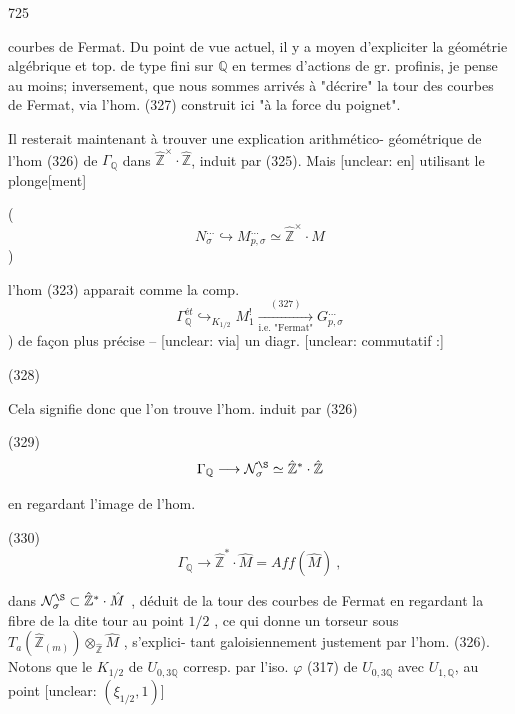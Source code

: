725

courbes de Fermat. Du point de vue actuel,
il y a moyen d'expliciter la géométrie
algébrique et top. de type fini sur $\mathbb{Q}$ en
termes d'actions de gr. profinis,
je pense au moins; inversement, que
nous sommes arrivés à "décrire" la
tour des courbes de Fermat, via
l'hom. (327) construit ici "à la
force du poignet".

Il resterait maintenant à
trouver une explication arithmético-
géométrique de l'hom (326) de
$\Gamma_{\mathbb{Q}}$ dans $\hat{\mathbb{Z}}^\times \cdot \hat{\mathbb{Z}}$, induit par (325).
Mais [unclear: en] utilisant le plonge[ment]

( $$ N_\sigma^{\dots} \hookrightarrow M_{p,\sigma}^{\dots} \simeq \hat{\mathbb{Z}}^\times \cdot M $$ )

l'hom (323) apparait comme la comp.
$$ \Gamma_{\mathbb{Q}}^{ét} \hookrightarrow_{K_{1/2}} M_{1}^{!} \xrightarrow[\text{i.e. "Fermat"}]{(327)} G_{p,\sigma}^{\dots} $$ )
de façon plus précise -- [unclear: via] un diagr.
[unclear: commutatif :]

\newpage


(328)

Cela signifie donc que l'on trouve
l'hom. induit par (326)

(329) $$\Gamma_{\mathbb{Q}} \longrightarrow \mathcal{N}_\sigma^\S \simeq \hat{\mathbb{Z}}^* \cdot \hat{\mathbb{Z}}$$

en regardant l'image de l'hom.

(330) $$\Gamma_{\mathbb{Q}} \longrightarrow \hat{\mathbb{Z}}^* \cdot \hat{M} = Aff(\hat{M}) \ ,$$

dans $\mathcal{N}_\sigma^\S \subset \hat{\mathbb{Z}}^* \cdot \hat{M}$ , déduit de la
tour des courbes de Fermat en
regardant la fibre de la dite tour
au point $1/2$ , ce qui donne un
torseur sous $T_a(\hat{\mathbb{Z}}_{(m)}) \otimes_{\hat{\mathbb{Z}}} \hat{M}$ , s'explici-
tant galoisiennement justement par
l'hom. (326). Notons que le $K_{1/2}$
de $U_{0,3\mathbb{Q}}$ corresp. par l'iso. $\varphi$ (317)
de $U_{0,3\mathbb{Q}}$ avec $U_{1,\mathbb{Q}}$, au point [unclear: $(\xi_{1/2}, 1)$]

